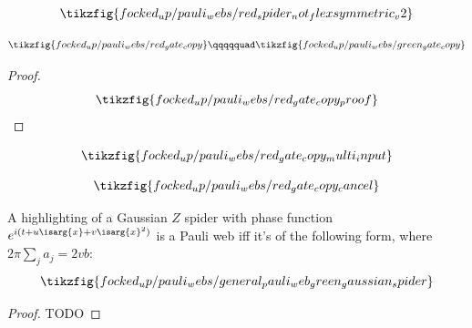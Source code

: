\begin{lemma}\label{lem:red_spider_not_flexsymmetric}
\begin{equation}\label{eq:red_spider_not_flexsymmetric}
\tikzfig{focked_up/pauli_webs/red_spider_not_flexsymmetric_v2}
\end{equation}
\end{lemma}

\begin{lemma}\label{lem:gate_copy}
\begin{equation}\label{eq:gate_copy}
\tikzfig{focked_up/pauli_webs/red_gate_copy}
\qqqqquad
\tikzfig{focked_up/pauli_webs/green_gate_copy}
\end{equation}
\begin{proof}
    \begin{equation}\label{eq:red_gate_copy_proof}
    \tikzfig{focked_up/pauli_webs/red_gate_copy_proof}
    \end{equation}
\end{proof}
\end{lemma}

\begin{lemma}\label{lem:red_gate_copy_multi_inputs}
\begin{equation}\label{eq:red_gate_copy_multi_inputs}
\tikzfig{focked_up/pauli_webs/red_gate_copy_multi_input}
\end{equation}
\end{lemma}

\begin{lemma}\label{lem:red_gate_copy_cancel}
\begin{equation}\label{eq:red_gate_copy_cancel}
\tikzfig{focked_up/pauli_webs/red_gate_copy_cancel}
\end{equation}
\end{lemma}

\begin{proposition}\label{thm:general_pauli_web_green_gaussian_spider}
A highlighting of a Gaussian $Z$ spider with phase function $e^{i(t + u\isarg{x} + v\isarg{x}^2)}$ is a Pauli web iff it's of the following form, where $2\pi \sum_j a_j = 2vb$:
\begin{equation}\label{eq:general_pauli_web_green_linear_spider}
\tikzfig{focked_up/pauli_webs/general_pauli_web_green_gaussian_spider}
\end{equation}
\begin{proof}
    TODO
\end{proof}
\end{proposition}

